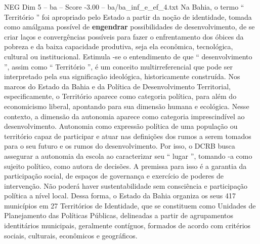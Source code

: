 \begin{textsample}{NEG Dim 5 – ba – Score -3.00 – ba/ba\_inf\_e\_ef\_4.txt}
Na Bahia, o termo “ Território ” foi apropriado pelo Estado a partir da noção de identidade, tomada como amálgama possível de \textbf{engendrar} possibilidades de desenvolvimento, de se criar laços e convergências possíveis para fazer o enfrentamento dos óbices da pobreza e da baixa capacidade produtiva, seja ela econômica, tecnológica, cultural ou institucional.
Estimula -se o entendimento de que “ desenvolvimento ”, assim como “ Território ”, é um conceito multirreferencial que pode ser interpretado pela sua significação ideológica, historicamente construída.
Nos marcos do Estado da Bahia e da Política de Desenvolvimento Territorial, especificamente, o Território aparece como categoria política, para além do economicismo liberal, apontando para sua dimensão humana e ecológica.
Nesse contexto, a dimensão da autonomia aparece como categoria imprescindível ao desenvolvimento.
Autonomia como expressão política de uma população ou território capaz de participar e atuar nas definições dos rumos a serem tomados para o seu futuro e os rumos do desenvolvimento.
Por isso, o DCRB busca assegurar a autonomia da escola ao caracterizar seu “ lugar ”, tomando -a como sujeito político, como autora de decisões.
A premissa para isso é a garantia da participação social, de espaços de governança e exercício de poderes de intervenção.
Não poderá haver sustentabilidade sem consciência e participação política a nível local.
Dessa forma, o Estado da Bahia organiza os seus 417 municípios em 27 Territórios de Identidade, que se constituem como Unidades de Planejamento das Políticas Públicas, delineadas a partir de agrupamentos identitários municipais, geralmente contíguos, formados de acordo com critérios sociais, culturais, econômicos e geográficos.

\end{textsample}
